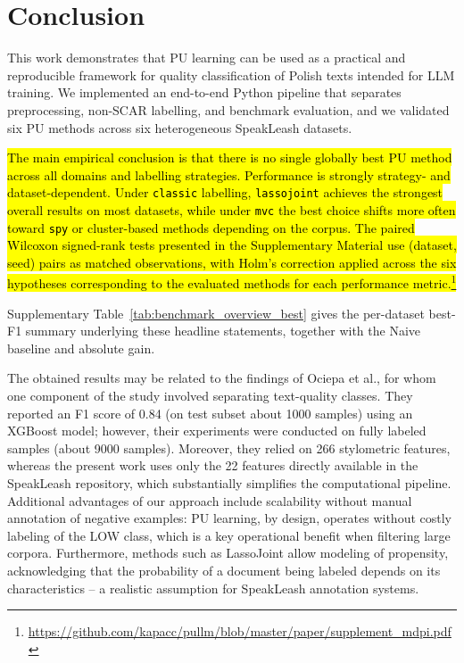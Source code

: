 \documentclass[applsci,article,submit,pdftex,moreauthors]{Definitions/mdpi}
\newcommand{\rev}[1]{\hl{#1}}
\begin{document}
\section{Conclusion}

This work demonstrates that PU learning can be used as a practical and reproducible framework for quality classification of Polish texts intended for LLM training. We implemented an end-to-end Python pipeline that separates preprocessing, non-SCAR labelling, and benchmark evaluation, and we validated six PU methods across six heterogeneous SpeakLeash datasets.

\rev{The main empirical conclusion is that there is no single globally best PU method across all domains and labelling strategies. Performance is strongly strategy- and dataset-dependent. Under \texttt{classic} labelling, \texttt{lassojoint} achieves the strongest overall results on most datasets, while under \texttt{mvc} the best choice shifts more often toward \texttt{spy} or cluster-based methods depending on the corpus. The paired Wilcoxon signed-rank tests presented in the Supplementary Material use (dataset, seed) pairs as matched observations, with Holm's correction applied across the six hypotheses corresponding to the evaluated methods for each performance metric.\footnote{\url{https://github.com/kapacc/pullm/blob/master/paper/supplement_mdpi.pdf}}}

Supplementary Table~\ref{tab:benchmark_overview_best} gives the per-dataset best-F1 summary underlying these headline statements, together with the Naive baseline and absolute gain.

The obtained results may be related to the findings of Ociepa et al.\cite{bielik7b}, for whom one component of the study involved separating text-quality classes. They reported an F1 score of 0.84 (on test subset about 1000 samples) using an XGBoost model; however, their experiments were conducted on fully labeled samples (about 9000 samples). Moreover, they relied on 266 stylometric features, whereas the present work uses only the 22 features directly available in the SpeakLeash repository, which substantially simplifies the computational pipeline. Additional advantages of our approach include scalability without manual annotation of negative examples: PU learning, by design, operates without costly labeling of the LOW class, which is a key operational benefit when filtering large corpora. Furthermore, methods such as LassoJoint allow modeling of propensity, acknowledging that the probability of a document being labeled depends on its characteristics -- a realistic assumption for SpeakLeash annotation systems.
\end{document}
